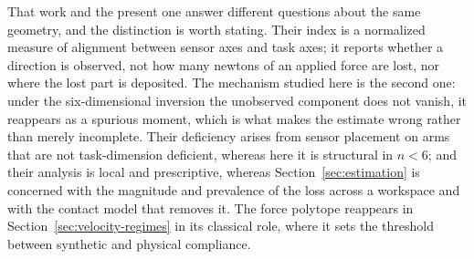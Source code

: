 \documentclass{ieeeaccess}
\begin{document}
That work and the present one answer different questions about the same geometry,
and the distinction is worth stating. Their index is a normalized measure of
alignment between sensor axes and task axes; it reports whether a direction is
observed, not how many newtons of an applied force are lost, nor where the lost
part is deposited. The mechanism studied here is the second one: under the
six-dimensional inversion the unobserved component does not vanish, it reappears
as a spurious moment, which is what makes the estimate wrong rather than merely
incomplete. Their deficiency arises from sensor placement on arms that are not
task-dimension deficient, whereas here it is structural in $n<6$; and their
analysis is local and prescriptive, whereas
Section~\ref{sec:estimation} is concerned with the magnitude and prevalence of the
loss across a workspace and with the contact model that removes it. The force
polytope reappears in Section~\ref{sec:velocity-regimes} in its classical role,
where it sets the threshold between synthetic and physical compliance.
\end{document}
